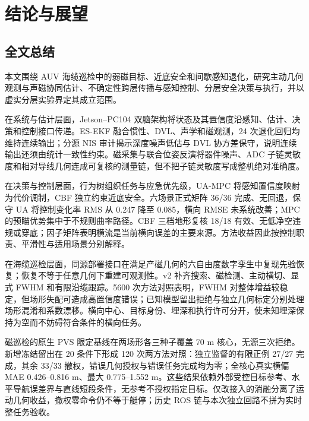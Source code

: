 
\chapter{结论与展望}

\section{全文总结}\label{sec:ch06-6-1}

本文围绕 AUV 海缆巡检中的弱磁目标、近底安全和间歇感知退化，研究主动几何观测与声磁协同估计、不确定性跨层传播与感知控制、分层安全决策与执行，并以虚实分层实验界定其成立范围。

在系统与估计层面，Jetson--PC104 双脑架构将状态及其置信度沿感知、估计、决策和控制接口传递。ES-EKF 融合惯性、DVL、声学和磁观测，24 次退化回归均维持连续输出；分源 NIS 审计揭示深度噪声低估与 DVL 协方差保守，说明连续输出还须由统计一致性约束。磁采集与联合位姿反演将器件噪声、ADC 子链灵敏度和相对导线几何连成可复核的测量链，但不把子链灵敏度写成整机绝对准确度。

在决策与控制层面，行为树组织任务与应急优先级，UA-MPC 将感知置信度映射为代价调制，CBF 独立约束近底安全。六场景正式矩阵 36/36 完成、无回退，保守 UA 将控制变化率 RMS 从 0.247 降至 0.085，横向 RMSE 未系统改善；MPC 的预瞄优势集中于不规则曲率路径。CBF 三档地形复核 18/18 有效、无低净空违规或穿底；因子矩阵表明横流是当前横向误差的主要来源。方法收益因此按控制职责、平滑性与适用场景分别解释。

在海缆巡检层面，同源部署接口在满足产磁几何的六自由度数字孪生中复现先验恢复；恢复不等于任意几何下重建可观测性。v2 补齐搜索、磁检测、主动横切、显式 FWHM 和有限沿缆跟踪。5600 次方法对照表明，FWHM 对整体增益较稳定，但场形失配可造成高置信度错误；已知模型留出拒绝与独立几何标定分别处理场形混淆和系数漂移。横向中心、目标身份、埋深和执行许可分开，使未知埋深保持为空而不妨碍符合条件的横向任务。

磁巡检的原生 PVS 限定基线在两场形各三种子覆盖 70 m 核心，无源三次拒绝。新增冻结留出在 20 条件下形成 120 次两方法对照：独立监督的有限正例 27/27 完成，其余 33/33 撤权，错误几何授权与错误任务完成均为零；全核心真实横偏 MAE 0.426--0.816 m、最大 0.775--1.552 m。这些结果依赖外部受控目标参考、水平导航误差界与直线短段条件，无参考不授权指定目标。仅改接入的消融分离了运动几何收益，撤权零命令仍不等于艇停；历史 ROS 链与本次独立回路不拼为实时整任务验收。

